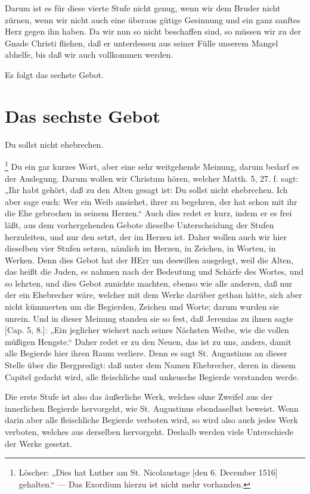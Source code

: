 Darum ist es für diese vierte Stufe nicht genug, wenn wir dem Bruder nicht zürnen, wenn wir nicht auch eine überaus gütige Gesinnung und ein ganz sanftes Herz gegen ihn haben. Da wir nun so nicht beschaffen sind, so müssen wir zu der Gnade Christi fliehen, daß er unterdessen aus seiner Fülle unserem Mangel abhelfe, bis daß wir auch vollkommen werden.

Es folgt das sechste Gebot.

\section{Das sechste Gebot}

\begin{schriftzitat}
Du sollst nicht ehebrechen.
\end{schriftzitat}

\footnote{Löscher: „Dies hat Luther am St. Nicolaustage [den 6. December 1516] gehalten.“ — Das Exordium hierzu ist nicht mehr vorhanden.} Du ein gar kurzes Wort, aber eine sehr weitgehende Meinung, darum bedarf es der Auslegung. Darum wollen wir Christum hören, welcher Matth. 5, 27. f. sagt: „Ihr habt gehört, daß zu den Alten gesagt ist: Du sollst nicht ehebrechen. Ich aber sage euch: Wer ein Weib ansiehet, ihrer zu begehren, der hat schon mit ihr die Ehe gebrochen in seinem Herzen.“ Auch dies redet er kurz, indem er es frei läßt, aus dem vorhergehenden Gebote dieselbe Unterscheidung der Stufen herzuleiten, und nur den setzt, der im Herzen ist. Daher wollen auch wir hier dieselben vier Stufen setzen, nämlich im Herzen, in Zeichen, in Worten, in Werken. Denn dies Gebot hat der HErr um deswillen ausgelegt, weil die Alten, das heißt die Juden, es nahmen nach der Bedeutung und Schärfe des Wortes, und so lehrten, und dies Gebot zunichte machten, ebenso wie alle anderen, daß nur der ein Ehebrecher wäre, welcher mit dem Werke darüber gethan hätte, sich aber nicht kümmerten um die Begierden, Zeichen und Worte; darum wurden sie unrein. Und in dieser Meinung standen sie so fest, daß Jeremias zu ihnen sagte [Cap. 5, 8.]: „Ein jeglicher wiehert nach seines Nächsten Weibe, wie die vollen müßigen Hengste.“ Daher redet er zu den Neuen, das ist zu uns, anders, damit alle Begierde hier ihren Raum verliere. Denn es sagt St. Augustinus an dieser Stelle über die Bergpredigt: daß unter dem Namen Ehebrecher, deren in diesem Capitel gedacht wird, alle fleischliche und unkeusche Begierde verstanden werde.

Die erste Stufe ist also das äußerliche Werk, welches ohne Zweifel aus der innerlichen Begierde hervorgeht, wie St. Augustinus ebendaselbst beweist. Wenn darin aber alle fleischliche Begierde verboten wird, so wird also auch jedes Werk verboten, welches aus derselben hervorgeht. Deshalb werden viele Unterschiede der Werke gesetzt.

